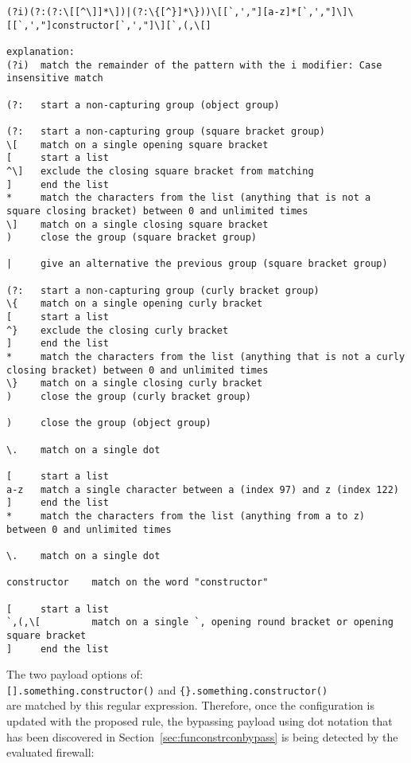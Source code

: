 \begin{lstlisting}[style=basicStyle, caption=regex of proposed rule id:2, label={lst:constructorsruleproposalregex}]
(?i)(?:(?:\[[^\]]*\])|(?:\{[^}]*\}))\[[`,',"][a-z]*[`,',"]\]\[[`,',"]constructor[`,',"]\][`,(,\[]

explanation:
(?i)  match the remainder of the pattern with the i modifier: Case insensitive match

(?:   start a non-capturing group (object group)

(?:   start a non-capturing group (square bracket group)
\[    match on a single opening square bracket
[     start a list
^\]   exclude the closing square bracket from matching
]     end the list
*     match the characters from the list (anything that is not a square closing bracket) between 0 and unlimited times
\]    match on a single closing square bracket
)     close the group (square bracket group)

|     give an alternative the previous group (square bracket group)

(?:	  start a non-capturing group (curly bracket group)
\{	  match on a single opening curly bracket
[     start a list
^}	  exclude the closing curly bracket
]     end the list
*     match the characters from the list (anything that is not a curly closing bracket) between 0 and unlimited times
\}	  match on a single closing curly bracket
)     close the group (curly bracket group)

)     close the group (object group)

\.    match on a single dot

[     start a list
a-z   match a single character between a (index 97) and z (index 122)
]     end the list
*     match the characters from the list (anything from a to z) between 0 and unlimited times

\.	  match on a single dot

constructor    match on the word "constructor"

[     start a list
`,(,\[         match on a single `, opening round bracket or opening square bracket
]     end the list
\end{lstlisting}

The two payload options of: \\
\verb|[].something.constructor()| and \verb|{}.something.constructor()| \\
are matched by this regular expression. Therefore, once the configuration is updated with the proposed rule, the bypassing payload using dot notation that has been discovered in Section~\ref{sec:funconstrconbypass} is being detected by the evaluated firewall:

